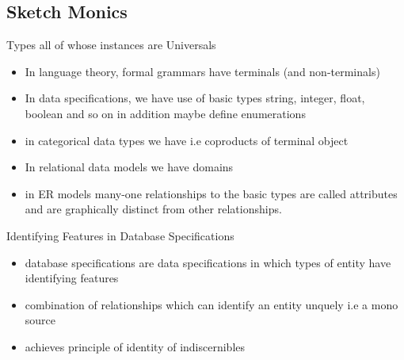 
\subsection{Sketch Monics}



\begin{frame}{Types all of whose instances are Universals}
\begin{itemize}
\item In language theory, formal grammars have terminals (and non-terminals)
\pause \item In data specifications, we have use of basic types string, integer, float, boolean and so on
              in addition maybe define enumerations 
\pause \item in categorical data types we have  i.e coproducts of terminal object
\pause \item In relational data models we have domains
\pause \item in ER models many-one relationships to the basic types are called attributes and are graphically distinct from other relationships.
\end{itemize}
\end{frame}


\begin{frame}{Identifying Features in Database Specifications}
\begin{itemize}
\item database specifications are data specifications in which types of entity have 
identifying features
\item combination of relationships which can identify an entity unquely
i.e a mono source
\item achieves principle of identity of indiscernibles
\end {itemize}
\end{frame}

